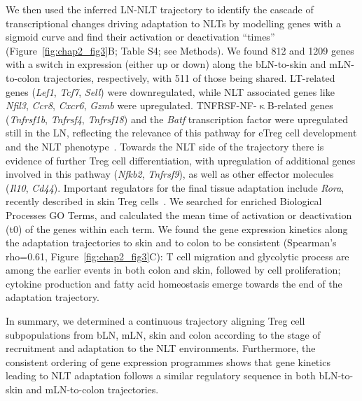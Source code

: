 We then used the inferred LN-NLT trajectory to identify the cascade of transcriptional changes driving adaptation to NLTs by modelling genes with a sigmoid curve and find their activation or deactivation “times” (Figure~\ref{fig:chap2_fig3}B; Table S4; see Methods). We found 812 and 1209 genes with a switch in expression (either up or down) along the bLN-to-skin and mLN-to-colon trajectories, respectively, with 511 of those being shared. LT-related genes (\textit{Lef1}, \textit{Tcf7}, \textit{Sell}) were downregulated, while NLT associated genes like \textit{Nfil3}, \textit{Ccr8}, \textit{Cxcr6}, \textit{Gzmb} were upregulated. TNFRSF-NF-${\upkappa}$B-related genes (\textit{Tnfrsf1b}, \textit{Tnfrsf4}, \textit{Tnfrsf18}) and the \textit{Batf} transcription factor were upregulated still in the LN, reflecting the relevance of this pathway for eTreg cell development and the NLT phenotype~\citep{Vasanthakumar2017-ib,Vasanthakumar2015-jw}. Towards the NLT side of the trajectory there is evidence of further Treg cell differentiation, with upregulation of additional genes involved in this pathway (\textit{Nfkb2}, \textit{Tnfrsf9}), as well as other effector molecules (\textit{Il10}, \textit{Cd44}). Important regulators for the final tissue adaptation include \textit{Rora}, recently described in skin Treg cells~\citep{Malhotra2018-nz}. We searched for enriched Biological Processes GO Terms, and calculated the mean time of activation or deactivation (t0) of the genes within each term. We found the gene expression kinetics along the adaptation trajectories to skin and to colon to be consistent (Spearman’s rho=0.61, Figure~\ref{fig:chap2_fig3}C): T cell migration and glycolytic process are among the earlier events in both colon and skin, followed by cell proliferation; cytokine production and fatty acid homeostasis emerge towards the end of the adaptation trajectory.

In summary, we determined a continuous trajectory aligning Treg cell subpopulations from bLN, mLN, skin and colon according to the stage of recruitment and adaptation to the NLT environments. Furthermore, the consistent ordering of gene expression programmes shows that gene kinetics leading to NLT adaptation follows a similar regulatory sequence in both bLN-to-skin and mLN-to-colon trajectories.


